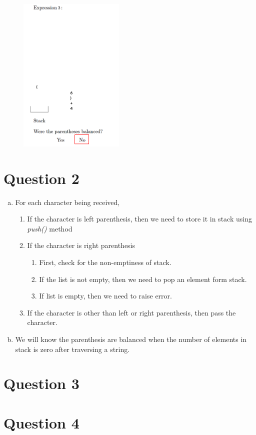 \documentclass[12pt]{article}
\begin{document}
\begin{figure}[h!]
    \includegraphics[width=0.45\textwidth]{images/worksheet_9_q1c_solution.png}\hfill
\end{figure}

\newpage

\section*{Question 2}
\begin{enumerate}[a.]
    \item

    For each character being received,

    \begin{enumerate}[1.]
        \item If the character is left parenthesis, then we need to store it in stack using \textit{push()} method
        \item If the character is right parenthesis
        \begin{enumerate}[1.]
            \item First, check for the non-emptiness of stack.
            \item If the list is not empty, then we need to pop an element form stack.
            \item If list is empty, then we need to raise error.
        \end{enumerate}
        \item If the character is other than left or right parenthesis, then pass the character.
    \end{enumerate}

    \item We will know the parenthesis are balanced when the number of elements
    in stack is zero after traversing a string.
\end{enumerate}

\section*{Question 3}

\section*{Question 4}
\end{document}
